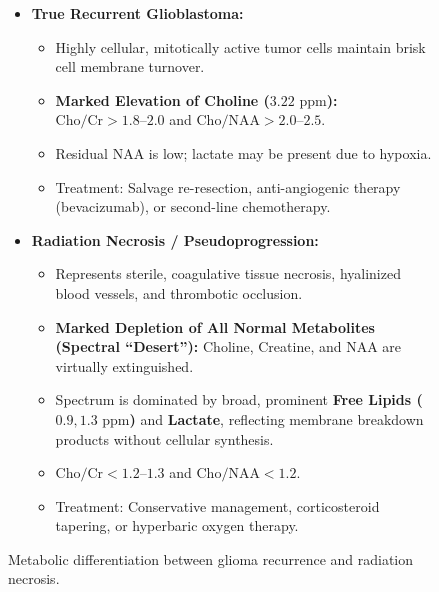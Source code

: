 \documentclass[11pt,a4paper]{article}
\begin{document}
\begin{figure}[htbp]
\centering
\begin{tcolorbox}[colback=teal!5!white,colframe=teal!60!black,title=\textbf{Spectroscopic Differentiation: Tumor Recurrence vs.\ Radiation Necrosis},width=\linewidth]
\small
\begin{itemize}[leftmargin=1.5em]
    \item \textbf{True Recurrent Glioblastoma:}
    \begin{itemize}
        \item Highly cellular, mitotically active tumor cells maintain brisk cell membrane turnover.
        \item \textbf{Marked Elevation of Choline ($3.22\text{ ppm}$):} $\text{Cho}/\text{Cr} > 1.8\text{--}2.0$ and $\text{Cho}/\text{NAA} > 2.0\text{--}2.5$.
        \item Residual NAA is low; lactate may be present due to hypoxia.
        \item Treatment: Salvage re-resection, anti-angiogenic therapy (bevacizumab), or second-line chemotherapy.
    \end{itemize}
    \vspace{0.6em}
    \item \textbf{Radiation Necrosis / Pseudoprogression:}
    \begin{itemize}
        \item Represents sterile, coagulative tissue necrosis, hyalinized blood vessels, and thrombotic occlusion.
        \item \textbf{Marked Depletion of All Normal Metabolites (Spectral ``Desert''):} Choline, Creatine, and NAA are virtually extinguished.
        \item Spectrum is dominated by broad, prominent \textbf{Free Lipids ($0.9, 1.3\text{ ppm}$)} and \textbf{Lactate}, reflecting membrane breakdown products without cellular synthesis.
        \item $\text{Cho}/\text{Cr} < 1.2\text{--}1.3$ and $\text{Cho}/\text{NAA} < 1.2$.
        \item Treatment: Conservative management, corticosteroid tapering, or hyperbaric oxygen therapy.
    \end{itemize}
\end{itemize}
\end{tcolorbox}
\caption{Metabolic differentiation between glioma recurrence and radiation necrosis.}
\label{fig:rad_necrosis_vs_recurrence}
\end{figure}
\end{document}
